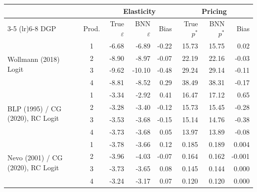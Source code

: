 \begin{tabular}{lcrrrrrr}
\toprule
 & & \multicolumn{3}{c}{Elasticity} & \multicolumn{3}{c}{Pricing} \\
\cmidrule(lr){3-5} \cmidrule(lr){6-8}
DGP & Prod. & True $\varepsilon$ & BNN $\varepsilon$ & Bias & True $p^*$ & BNN $p^*$ & Bias \\
\midrule
\multirow{4}{*}{Wollmann (2018) Logit} & 1 & -6.68 & -6.89 & -0.22 & 15.73 & 15.75 & 0.02 \\
 & 2 & -8.90 & -8.97 & -0.07 & 22.19 & 22.16 & -0.03 \\
 & 3 & -9.62 & -10.10 & -0.48 & 29.24 & 29.14 & -0.11 \\
 & 4 & -8.81 & -8.52 & 0.29 & 38.49 & 38.31 & -0.17 \\
\midrule
\multirow{4}{*}{BLP (1995) / CG (2020), RC Logit} & 1 & -3.34 & -2.92 & 0.41 & 16.47 & 17.12 & 0.65 \\
 & 2 & -3.28 & -3.40 & -0.12 & 15.73 & 15.45 & -0.28 \\
 & 3 & -3.53 & -3.68 & -0.15 & 15.14 & 14.76 & -0.38 \\
 & 4 & -3.73 & -3.68 & 0.05 & 13.97 & 13.89 & -0.08 \\
\midrule
\multirow{4}{*}{Nevo (2001) / CG (2020), RC Logit} & 1 & -3.78 & -3.66 & 0.12 & 0.185 & 0.189 & 0.004 \\
 & 2 & -3.96 & -4.03 & -0.07 & 0.164 & 0.162 & -0.001 \\
 & 3 & -3.73 & -3.65 & 0.08 & 0.145 & 0.144 & 0.000 \\
 & 4 & -3.24 & -3.17 & 0.07 & 0.120 & 0.120 & 0.000 \\
\bottomrule
\end{tabular}
